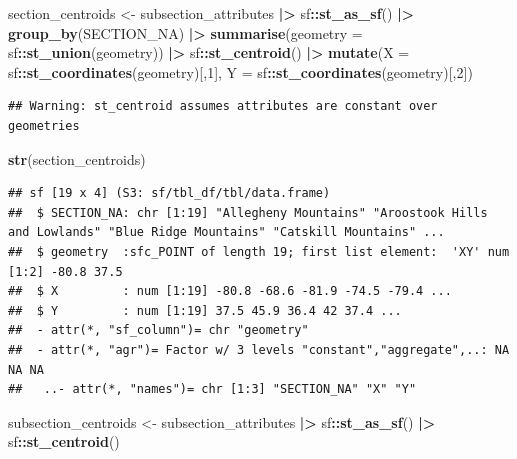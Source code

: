 \documentclass[
]{book}
\newenvironment{Shaded}{\begin{snugshade}}{\end{snugshade}}
\newcommand{\AttributeTok}[1]{\textcolor[rgb]{0.13,0.29,0.53}{#1}}
\newcommand{\DecValTok}[1]{\textcolor[rgb]{0.00,0.00,0.81}{#1}}
\newcommand{\FunctionTok}[1]{\textcolor[rgb]{0.13,0.29,0.53}{\textbf{#1}}}
\newcommand{\NormalTok}[1]{#1}
\newcommand{\OtherTok}[1]{\textcolor[rgb]{0.56,0.35,0.01}{#1}}
\newcommand{\SpecialCharTok}[1]{\textcolor[rgb]{0.81,0.36,0.00}{\textbf{#1}}}
\begin{document}
\begin{Shaded}
\begin{Highlighting}[]
\NormalTok{section\_centroids }\OtherTok{\textless{}{-}}\NormalTok{ subsection\_attributes }\SpecialCharTok{|\textgreater{}}
\NormalTok{  sf}\SpecialCharTok{::}\FunctionTok{st\_as\_sf}\NormalTok{() }\SpecialCharTok{|\textgreater{}}
  \FunctionTok{group\_by}\NormalTok{(SECTION\_NA) }\SpecialCharTok{|\textgreater{}}
  \FunctionTok{summarise}\NormalTok{(}\AttributeTok{geometry =}\NormalTok{ sf}\SpecialCharTok{::}\FunctionTok{st\_union}\NormalTok{(geometry)) }\SpecialCharTok{|\textgreater{}}
\NormalTok{  sf}\SpecialCharTok{::}\FunctionTok{st\_centroid}\NormalTok{() }\SpecialCharTok{|\textgreater{}}
  \FunctionTok{mutate}\NormalTok{(}\AttributeTok{X =}\NormalTok{ sf}\SpecialCharTok{::}\FunctionTok{st\_coordinates}\NormalTok{(geometry)[,}\DecValTok{1}\NormalTok{],}
         \AttributeTok{Y =}\NormalTok{ sf}\SpecialCharTok{::}\FunctionTok{st\_coordinates}\NormalTok{(geometry)[,}\DecValTok{2}\NormalTok{])}
\end{Highlighting}
\end{Shaded}

\begin{verbatim}
## Warning: st_centroid assumes attributes are constant over geometries
\end{verbatim}

\begin{Shaded}
\begin{Highlighting}[]
\FunctionTok{str}\NormalTok{(section\_centroids)}
\end{Highlighting}
\end{Shaded}

\begin{verbatim}
## sf [19 x 4] (S3: sf/tbl_df/tbl/data.frame)
##  $ SECTION_NA: chr [1:19] "Allegheny Mountains" "Aroostook Hills and Lowlands" "Blue Ridge Mountains" "Catskill Mountains" ...
##  $ geometry  :sfc_POINT of length 19; first list element:  'XY' num [1:2] -80.8 37.5
##  $ X         : num [1:19] -80.8 -68.6 -81.9 -74.5 -79.4 ...
##  $ Y         : num [1:19] 37.5 45.9 36.4 42 37.4 ...
##  - attr(*, "sf_column")= chr "geometry"
##  - attr(*, "agr")= Factor w/ 3 levels "constant","aggregate",..: NA NA NA
##   ..- attr(*, "names")= chr [1:3] "SECTION_NA" "X" "Y"
\end{verbatim}

\begin{Shaded}
\begin{Highlighting}[]
\NormalTok{subsection\_centroids }\OtherTok{\textless{}{-}}\NormalTok{ subsection\_attributes }\SpecialCharTok{|\textgreater{}}
\NormalTok{  sf}\SpecialCharTok{::}\FunctionTok{st\_as\_sf}\NormalTok{() }\SpecialCharTok{|\textgreater{}}
\NormalTok{  sf}\SpecialCharTok{::}\FunctionTok{st\_centroid}\NormalTok{()}
\end{Highlighting}
\end{Shaded}
\end{document}
